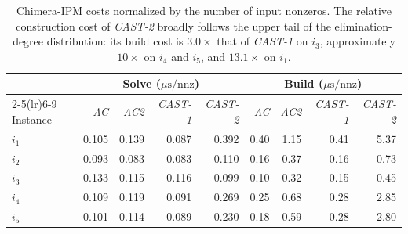 \documentclass{article}
\newcommand{\CASTone}{\textit{CAST-1}\xspace}
\newcommand{\CASTtwo}{\textit{CAST-2}\xspace}
\newcommand{\AC}{\textit{AC}\xspace}
\newcommand{\ACtwo}{\textit{AC2}\xspace}
\newcommand{\1}{\mathbbm{1}}
\theoremstyle{plain}
\begin{document}
\begin{table}[t]
\centering
\caption{Chimera-IPM costs normalized by the number of input
nonzeros. The relative
construction cost of \CASTtwo broadly follows the upper tail of the
elimination-degree distribution: its build cost is $3.0\times$ that
of \CASTone on $i_3$, approximately $10\times$ on $i_4$ and $i_5$,
and $13.1\times$ on $i_1$. }
\label{tab:chimera_nnz}
\small
\begin{tabular}{l rrrr rrrr}
\toprule
& \multicolumn{4}{c}{Solve ($\mu\mathrm{s}/\mathrm{nnz}$)} &
\multicolumn{4}{c}{Build ($\mu\mathrm{s}/\mathrm{nnz}$)} \\
\cmidrule(lr){2-5}\cmidrule(lr){6-9}
Instance & \AC & \ACtwo & \CASTone & \CASTtwo &
\AC & \ACtwo & \CASTone & \CASTtwo \\
\midrule
$i_1$ & 0.105 & 0.139 & 0.087 & 0.392 & 0.40 & 1.15 & 0.41 & 5.37 \\
$i_2$ & 0.093 & 0.083 & 0.083 & 0.110 & 0.16 & 0.37 & 0.16 & 0.73 \\
$i_3$ & 0.133 & 0.115 & 0.116 & 0.099 & 0.10 & 0.32 & 0.15 & 0.45 \\
$i_4$ & 0.109 & 0.119 & 0.091 & 0.269 & 0.25 & 0.68 & 0.28 & 2.85 \\
$i_5$ & 0.101 & 0.114 & 0.089 & 0.230 & 0.18 & 0.59 & 0.28 & 2.80 \\
\bottomrule
\end{tabular}
\end{table}







\end{document}
